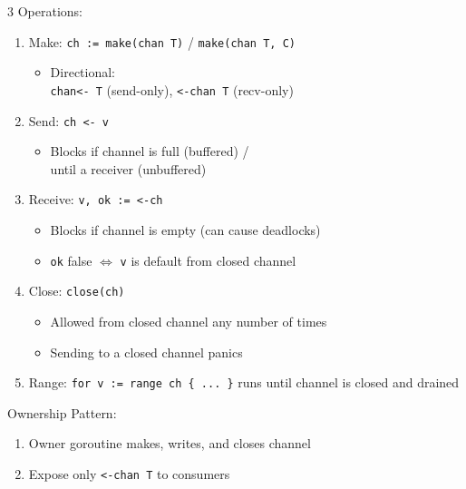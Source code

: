 \documentclass[12pt, a4paper]{article}
\begin{document}
\begin{multicols*}{3}
Operations:
\begin{enumerate}[\roman*.]
  \item Make: \lstinline|ch := make(chan T)| / \lstinline|make(chan T, C)|
    \begin{itemize}[leftmargin=*]\vspace{3pt}
      \item Directional:\\\lstinline|chan<- T| (send-only), \lstinline|<-chan T| (recv-only)
    \end{itemize}
  \item Send: \lstinline|ch <- v|
    \begin{itemize}[leftmargin=*]\vspace{3pt}
      \item Blocks if channel is full (buffered) /\\until a receiver  (unbuffered)
    \end{itemize}
  \item Receive: \lstinline|v, ok := <-ch|
    \begin{itemize}[leftmargin=*]\vspace{3pt}
      \item Blocks if channel is empty (can cause deadlocks)
      \item \lstinline|ok| false $\iff$ \lstinline|v| is default from closed channel
    \end{itemize}
  \item Close: \lstinline|close(ch)|
    \begin{itemize}[leftmargin=*]\vspace{3pt}
      \item Allowed from closed channel any number of times
      \item Sending to a closed channel panics
    \end{itemize}
  \item Range: \lstinline|for v := range ch { ... }| runs until channel is closed and drained
\end{enumerate}

Ownership Pattern:
\begin{enumerate}[\roman*.]
  \item Owner goroutine makes, writes, and closes channel
  \item Expose only \lstinline|<-chan T| to consumers
\end{enumerate}

\colbreak

\end{multicols*}
\end{document}

